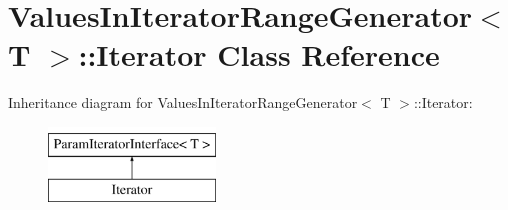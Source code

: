 \hypertarget{classtesting_1_1internal_1_1ValuesInIteratorRangeGenerator_1_1Iterator}{\section{\-Values\-In\-Iterator\-Range\-Generator$<$ \-T $>$\-:\-:\-Iterator \-Class \-Reference}
\label{da/d4b/classtesting_1_1internal_1_1ValuesInIteratorRangeGenerator_1_1Iterator}
}
\-Inheritance diagram for \-Values\-In\-Iterator\-Range\-Generator$<$ \-T $>$\-:\-:\-Iterator\-:\begin{figure}[H]
\begin{center}
\leavevmode
\includegraphics[height=2.000000cm]{da/d4b/classtesting_1_1internal_1_1ValuesInIteratorRangeGenerator_1_1Iterator}
\end{center}
\end{figure}
